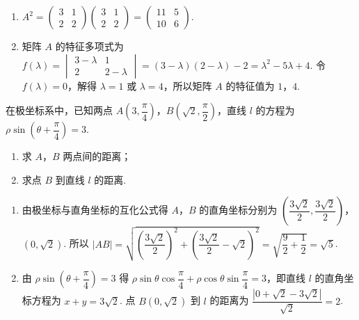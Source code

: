 \begin{solution}
\begin{enumerate}
\item \(A^2=\begin{pmatrix}3&1\\2&2\end{pmatrix}\begin{pmatrix}3&1\\2&2\end{pmatrix}=\begin{pmatrix}11&5\\10&6\end{pmatrix}\).
\item 矩阵 \(A\) 的特征多项式为 \(f(\lambda)=\begin{vmatrix}3-\lambda&1\\2&2-\lambda\end{vmatrix}=(3-\lambda)(2-\lambda)-2=\lambda^2-5\lambda+4\). 令 \(f(\lambda)=0\)，解得 \(\lambda=1\) 或 \(\lambda=4\)，所以矩阵 \(A\) 的特征值为 \(1\)，\(4\).
\end{enumerate}
\end{solution}

\reuseproblemnumber
\begin{problem}[B]
在极坐标系中，已知两点 \(A\!\left(3,\dfrac{\pi}{4}\right)\)，\(B\!\left(\sqrt2,\dfrac{\pi}{2}\right)\)，直线 \(l\) 的方程为 \(\rho\sin\left(\theta+\dfrac{\pi}{4}\right)=3\).

\begin{enumerate}
\item 求 \(A\)，\(B\) 两点间的距离；
\item 求点 \(B\) 到直线 \(l\) 的距离.
\end{enumerate}

\end{problem}

\begin{solution}
\begin{enumerate}
\item 由极坐标与直角坐标的互化公式得 \(A\)，\(B\) 的直角坐标分别为 \(\left(\dfrac{3\sqrt2}{2},\dfrac{3\sqrt2}{2}\right)\)，\((0,\sqrt2)\). 所以 \(|AB|=\sqrt{\left(\dfrac{3\sqrt2}{2}\right)^2+\left(\dfrac{3\sqrt2}{2}-\sqrt2\right)^2}=\sqrt{\dfrac92+\dfrac12}=\sqrt5\).
\item 由 \(\rho\sin\left(\theta+\dfrac{\pi}{4}\right)=3\) 得 \(\rho\sin\theta\cos\dfrac{\pi}{4}+\rho\cos\theta\sin\dfrac{\pi}{4}=3\)，即直线 \(l\) 的直角坐标方程为 \(x+y=3\sqrt2\). 点 \(B(0,\sqrt2)\) 到 \(l\) 的距离为 \(\dfrac{|0+\sqrt2-3\sqrt2|}{\sqrt2}=2\).
\end{enumerate}
\end{solution}

